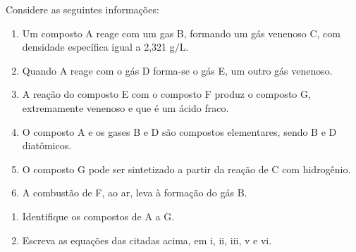 Considere as seguintes informações:

\begin{enumerate}[label = (\scaleroman{\roman*})]
	\item Um composto A reage com um gas B, formando um gás venenoso C, com densidade específica igual a 2,321 g/L.
	\item Quando A reage com o gás D forma-se o gás E, um outro gás venenoso.
	\item A reação do composto E com o composto F produz o composto G, extremamente venenoso e que é um ácido fraco.
	\item O composto A e os gases B e D são compostos elementares, sendo B e D diatômicos.
	\item O composto G pode ser sintetizado a partir da reação de C com hidrogênio.
	\item A combustão de F, ao ar, leva à formação do gás B.
\end{enumerate}

\begin{enumerate}[label = (\scalealph{\alph*})]
	\item Identifique os compostos de A a G.
	\item Escreva as equações das citadas acima, em i, ii, iii, v e vi.
\end{enumerate}
